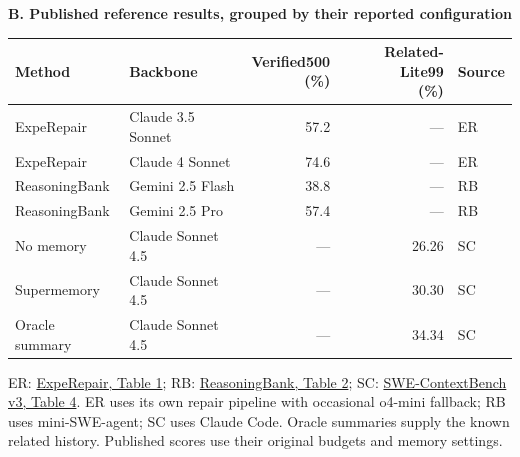 \begin{table}[!htbp]
\medskip
\textbf{B. Published reference results, grouped by their reported configuration}\\[3pt]
\begin{tabular}{llrrl}
\toprule
Method & Backbone & \shortstack{Verified500\\(\%)} & \shortstack{Related-Lite99\\(\%)} & Source \\
\midrule
ExpeRepair & Claude 3.5 Sonnet & 57.2 & --- & ER \\
ExpeRepair & Claude 4 Sonnet & 74.6 & --- & ER \\
ReasoningBank & Gemini 2.5 Flash & 38.8 & --- & RB \\
ReasoningBank & Gemini 2.5 Pro & 57.4 & --- & RB \\
No memory & Claude Sonnet 4.5 & --- & 26.26 & SC \\
Supermemory & Claude Sonnet 4.5 & --- & 30.30 & SC \\
Oracle summary & Claude Sonnet 4.5 & --- & 34.34 & SC \\
\bottomrule
\end{tabular}

\smallskip
\begin{minipage}{\linewidth}\footnotesize
ER: \href{https://arxiv.org/html/2506.10484v2}{ExpeRepair, Table 1};
RB: \href{https://arxiv.org/html/2509.25140}{ReasoningBank, Table 2};
SC: \href{https://arxiv.org/html/2602.08316v3\#S3.T4}{SWE-ContextBench v3, Table 4}.
ER uses its own repair pipeline with occasional o4-mini fallback;
RB uses mini-SWE-agent; SC uses Claude Code.
Oracle summaries supply the known related history. Published scores use
their original budgets and memory settings.
\end{minipage}
\end{table}
